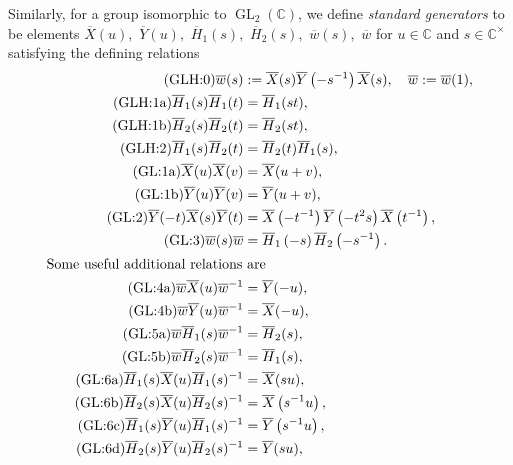 \documentclass[11pt,letterpaper]{amsart}
\numberwithin{thecounter}{section}
\theoremstyle{definition}
\DeclareMathOperator{\GL}{GL}
\newcommand{\C}{{\mathbb C}}
\begin{document}
Similarly, 
for a group isomorphic to $\GL_2(\C)$,
we define \emph{standard generators} to be elements
$\overline{X}(u),$ $
\overline{Y}(u),$ $
\overline{H}_1(s),$ $
\overline{H}_2(s),$ $ \overline{w}(s),$ $\overline{w}$ for $u\in\C$ and $s\in\C^\times$
satisfying the defining relations 
\begingroup\allowdisplaybreaks
\begin{align*}
\tag{GLH:0}\label{GL2-wdefn} 
  \overline{w}(s) &:= \overline{X}(s) \overline{Y}\left(-s^{-1} \right) \overline{X}(s),\quad \overline{w} := \overline{w}(1),\\
\tag{GLH:1a}\label{GL2-H1H1}
   \overline{H}_1(s)\overline{H}_1(t)&=\overline{H}_1(st),\\
\tag{GLH:1b}\label{GL2-H2H2}
   \overline{H}_2(s)\overline{H}_2(t)&=\overline{H}_2(st),\\
\tag{GLH:2}\label{GL2-H1H2}
    \overline{H}_1(s)\overline{H}_2(t)&=\overline{H}_2(t)\overline{H}_1(s),\\
\tag{GL:1a}\label{GL2-XX}
   \overline{X}(u)\overline{X}(v)&=\overline{X}(u+v),\\
\tag{GL:1b}\label{GL2-YY}
   \overline{Y}(u)\overline{Y}(v)&=\overline{Y}(u+v),\\
\tag{GL:2}\label{GL2-XY}
  \overline{Y}(-t)\overline{X}(s)\overline{Y}(t)&= \overline{X}\left(-t^{-1} \right) \overline{Y}\left(-t^{2}s \right) \overline{X}\left(t^{-1} \right),\\
\tag{GL:3}\label{GL2-wwH}
  \overline{w}(s)\overline{w}&=\overline{H}_1\left(-s \right)\overline{H}_2\left(-s^{-1} \right). \\
\intertext{Some useful additional relations are}
\tag{GL:4a}\label{GL2-wX}
  \overline{w}\overline{X}(u)\overline{w}^{-1}&=\overline{Y}(-u),\\
\tag{GL:4b}\label{GL2-wY}
  \overline{w}\overline{Y}(u)\overline{w}^{-1}&=\overline{X}(-u),\\
\tag{GL:5a}\label{GL2-wH1}
  \overline{w} \overline{H}_1(s)\overline{w}^{-1} &= \overline{H}_2(s),\\
\tag{GL:5b}\label{GL2-wH2}
  \overline{w} \overline{H}_2(s)\overline{w}^{-1}  &= \overline{H}_1(s),\\
\tag{GL:6a}\label{GL2-H1X}
  \overline{H}_1(s)\overline{X}(u)\overline{H}_1(s)^{-1}&=\overline{X}(su),\\
\tag{GL:6b}\label{GL2-H2X}
 \overline{H}_2(s)\overline{X}(u)\overline{H}_2(s)^{-1}&=\overline{X}\left(s^{-1}u\right),\\
\tag{GL:6c}\label{GL2-H1Y}
  \overline{H}_1(s)\overline{Y}(u)\overline{H}_1(s)^{-1}&=\overline{Y}\left(s^{-1}u \right),\\
\tag{GL:6d}\label{GL2-H2Y}
  \overline{H}_2(s)\overline{Y}(u)\overline{H}_2(s)^{-1}&=\overline{Y}(su),
\end{align*}
\end{document}
